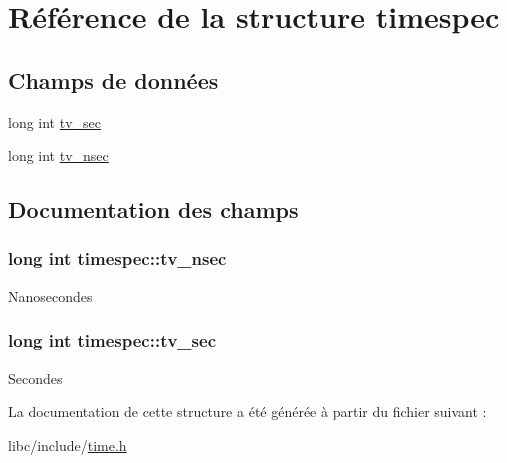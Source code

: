 \hypertarget{structtimespec}{\section{Référence de la structure timespec}
\label{structtimespec}
}
\subsection*{Champs de données}
\begin{DoxyCompactItemize}
\item 
long int \hyperlink{structtimespec_af632894a12c37dea87073c0126f99fff}{tv\-\_\-sec}
\item 
long int \hyperlink{structtimespec_aa9689622a344d847333e534ac23d3093}{tv\-\_\-nsec}
\end{DoxyCompactItemize}


\subsection{Documentation des champs}
\hypertarget{structtimespec_aa9689622a344d847333e534ac23d3093}{
\subsubsection[{tv\-\_\-nsec}]{\setlength{\rightskip}{0pt plus 5cm}long int timespec\-::tv\-\_\-nsec}}\label{structtimespec_aa9689622a344d847333e534ac23d3093}
Nanosecondes \hypertarget{structtimespec_af632894a12c37dea87073c0126f99fff}{
\subsubsection[{tv\-\_\-sec}]{\setlength{\rightskip}{0pt plus 5cm}long int timespec\-::tv\-\_\-sec}}\label{structtimespec_af632894a12c37dea87073c0126f99fff}
Secondes 

La documentation de cette structure a été générée à partir du fichier suivant \-:\begin{DoxyCompactItemize}
\item 
libc/include/\hyperlink{time_8h}{time.\-h}\end{DoxyCompactItemize}
